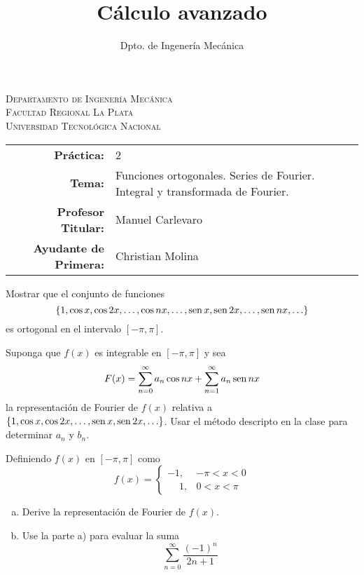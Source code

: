 \documentclass[11pt]{article}
\title{Cálculo avanzado}
\author{Dpto. de Ingenería Mecánica}
\begin{document}
\begin{center}
\end{center} 

\begin{center}
\vspace{\baselineskip}
\Large{\textsc{Departamento de Ingenería Mecánica}} \\
\textsc{Facultad Regional La Plata} \\
\textsc{Universidad Tecnológica Nacional}
\end{center}


\begin{center}
\begin{tabular}{r l}
    \textbf{Práctica:} & 2 \\
 \textbf{Tema:} & Funciones ortogonales. Series de Fourier. Integral y transformada de Fourier. \\
 \textbf{Profesor Titular:} & Manuel Carlevaro \\
 \textbf{Ayudante de Primera:} & Christian Molina
\end{tabular}\end{center}

\vspace{1em}

\begin{question} %
 Mostrar que el conjunto de funciones
 \[ \{1 , \cos x, \cos 2x, \ldots, \cos nx, \ldots, \operatorname{sen} x, \operatorname{sen} 2x, \ldots, \operatorname{sen} nx, \ldots \} \]
 es ortogonal en el intervalo $[-\pi, \pi]$.
\end{question}

\begin{question} %
Suponga que $f(x)$ es integrable en $[-\pi, \pi]$ y sea
\[ F(x) = \sum_{n = 0}^{\infty} a_n \cos nx + \sum_{n = 1}^{\infty} a_n \operatorname{sen} nx \]
la representación de Fourier de $f(x)$ relativa a $\{1, \cos x, \cos 2x, \ldots, \operatorname{sen} x, \operatorname{sen} 2x, \ldots \}$. Usar el método descripto en la clase para determinar $a_n$ y $b_n$.
\end{question}

\begin{question} %
Definiendo $f(x)$ en $[-\pi, \pi]$ como
\[ f(x) = \begin{cases}
    -1,&  -\pi < x < 0 \\
    \phantom{-}1,&  0 < x < \pi
        \end{cases} \]
\begin{enumerate}[a)]
\item Derive la representación de Fourier de $f(x)$.
\item Use la parte a) para evaluar la suma
    \[ \sum_{n = 0}^{\infty} \frac{(-1)^n}{2 n + 1} \]
\end{enumerate}
\end{question}
\end{document}
